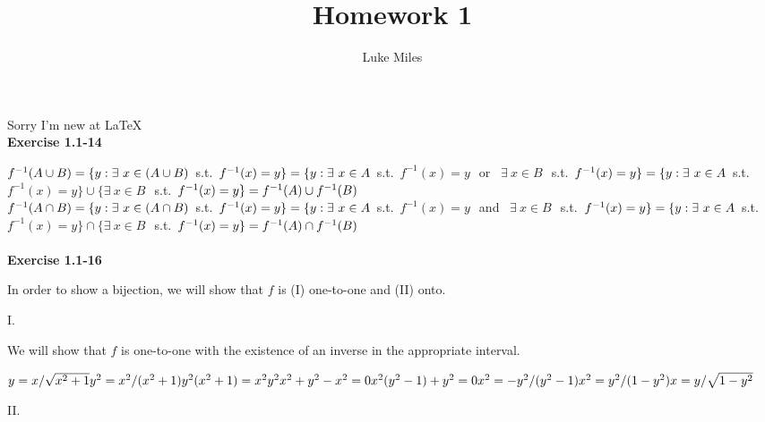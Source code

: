 \title{Homework 1}
\author{Luke Miles}
\setlength{\parindent}{0pt}

\maketitle
Sorry I'm new at \LaTeX \\

\textbf{Exercise 1.1-14}

$f^{-1}(A \cup B) \\
 = \{y : \exists\ x \in (A \cup B) $\ s.t.\ $ f^{-1}(x) = y\} \\
 = \{y : \exists\ x \in A $\ s.t.\ $ f^{-1}(x) = y\ $\ or \ $ \exists\ x \in B\ $\ s.t.\ $ f^{-1}(x) = y\} \\
 = \{y : \exists\ x \in A $\ s.t.\ $ f^{-1}(x) = y\} \cup \{ \exists\ x \in B\ $\ s.t.\ $ f^{-1}(x) = y\} \\
 = f^{-1}(A) \cup f^{-1}(B) $ \\

$f^{-1}(A \cap B) \\
 = \{y : \exists\ x \in (A \cap B) $\ s.t.\ $ f^{-1}(x) = y\} \\
 = \{y : \exists\ x \in A $\ s.t.\ $ f^{-1}(x) = y\ $\ and \ $ \exists\ x \in B\ $\ s.t.\ $ f^{-1}(x) = y\} \\
 = \{y : \exists\ x \in A $\ s.t.\ $ f^{-1}(x) = y\} \cap \{ \exists\ x \in B\ $\ s.t.\ $ f^{-1}(x) = y\} \\
 = f^{-1}(A) \cap f^{-1}(B) $ \\\\

\textbf{Exercise 1.1-16}

In order to show a bijection, we will show that $f$ is (I) one-to-one and (II) onto.

I.

We will show that $f$ is one-to-one with the existence of an inverse in the appropriate interval.

$
y = x/\sqrt{x^2+1}\\
y^2 = x^2/(x^2+1)\\
y^2 (x^2+1) = x^2\\
y^2 x^2+y^2-x^2 = 0\\
x^2 (y^2-1) + y^2 = 0\\
x^2 = -y^2/(y^2-1)\\
x^2 = y^2/(1-y^2)\\
x = y/\sqrt{1-y^2}\\
$

II.


